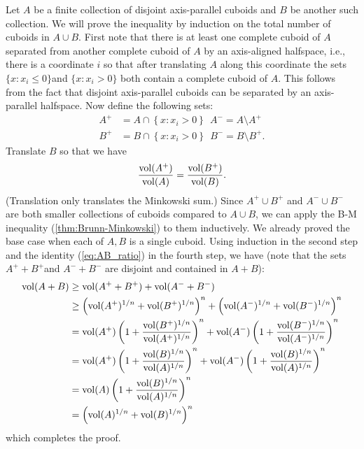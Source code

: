 Let $A$ be a finite collection of disjoint axis-parallel cuboids
and $B$ be another such collection. We will prove the inequality
by induction on the total number of cuboids in $A\cup B$. First note
that there is at least one complete cuboid of $A$ separated from
another complete cuboid of $A$ by an axis-aligned halfspace, i.e.,
there is a coordinate $i$ so that after translating $A$ along this
coordinate the sets $\{x:x_{i}\le0\}$and $\{x:x_{i}>0\}$ both contain
a complete cuboid of $A$. This follows from the fact that disjoint
axis-parallel cuboids can be separated by an axis-parallel halfspace.
Now define the following sets:
\begin{align*}
A^{+} & =A\cap\left\{ x:x_{i}>0\right\} \ \ A^{-}=A\setminus A^{+}\\
B^{+} & =B\cap\left\{ x:x_{i}>0\right\} \ \ B^{-}=B\setminus B^{+}.
\end{align*}
Translate $B$ so that we have 
\begin{equation}
\frac{\mathrm{vol}(A^{+})}{\mathrm{vol}(A)}=\frac{\mathrm{vol}(B^{+})}{\mathrm{vol}(B)}.\label{eq:AB_ratio}
\end{equation}
(Translation only translates the Minkowski sum.) Since $A^{+}\cup B^{+}$
and $A^{-}\cup B^{-}$ are both smaller collections of cuboids compared
to $A\cup B$, we can apply the B-M inequality (\ref{thm:Brunn-Minkowski})
to them inductively. We already proved the base case when each of
$A,B$ is a single cuboid. Using induction in the second step and
the identity (\ref{eq:AB_ratio}) in the fourth step, we have (note
that the sets $A^{+}+B^{+}$and $A^{-}+B^{-}$ are disjoint and contained
in $A+B$):
\begin{align*}
\mathrm{vol}(A+B) & \ge\mathrm{vol}(A^{+}+B^{+})+\mathrm{vol}(A^{-}+B^{-})\\
 & \ge\left(\mathrm{vol}(A^{+})^{1/n}+\mathrm{vol}(B^{+})^{1/n}\right)^{n}+\left(\mathrm{vol}(A^{-})^{1/n}+\mathrm{vol}(B^{-})^{1/n}\right)^{n}\\
 & =\mathrm{vol}(A^{+})\left(1+\frac{\mathrm{vol}(B^{+})^{1/n}}{\mathrm{vol}(A^{+})^{1/n}}\right)^{n}+\mathrm{vol}(A^{-})\left(1+\frac{\mathrm{vol}(B^{-})^{1/n}}{\mathrm{vol}(A^{-})^{1/n}}\right)^{n}\\
 & =\mathrm{vol}(A^{+})\left(1+\frac{\mathrm{vol}(B)^{1/n}}{\mathrm{vol}(A)^{1/n}}\right)^{n}+\mathrm{vol}(A^{-})\left(1+\frac{\mathrm{vol}(B)^{1/n}}{\mathrm{vol}(A)^{1/n}}\right)^{n}\\
 & =\mathrm{vol}(A)\left(1+\frac{\mathrm{vol}(B)^{1/n}}{\mathrm{vol}(A)^{1/n}}\right)^{n}\\
 & =\left(\mathrm{vol}(A)^{1/n}+\mathrm{vol}(B)^{1/n}\right)^{n}
\end{align*}
which completes the proof.%


